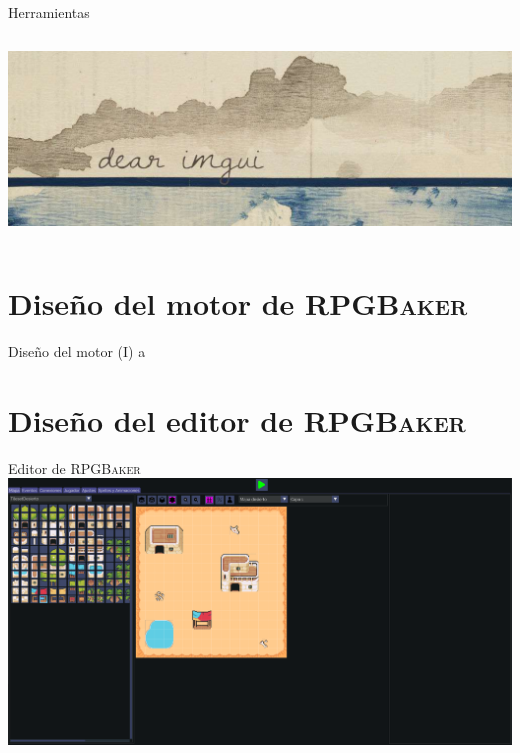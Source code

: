 \documentclass{beamer}
\newcommand{\baker}{%
	\textsc{RPGBaker}%
}
\begin{document}
\begin{frame}{Herramientas}
\begin{columns}
\begin{center}
\begin{columns}
				\includegraphics[width=\textwidth]{imgs/herramientas/dearimgui.pdf}
			\end{columns}
		\end{center}
	\end{columns}
\end{frame}
\section{Diseño del motor de \baker}
\begin{frame}{Diseño del motor (I) }
a
\end{frame}

\section{Diseño del editor de \baker}
\begin{frame}{Editor de \baker}
	\includegraphics[width=\textwidth]{imgs/editor/editorMapas.pdf}
\end{frame}
\end{document}
